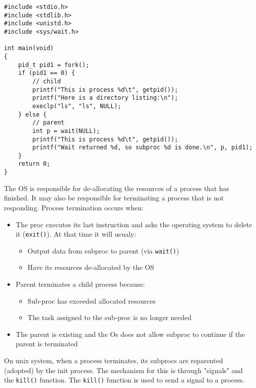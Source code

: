 \documentclass[a4paper, 10pt]{article}
\begin{document}
\begin{lstlisting}[style=cStyle, caption={Overlaying a process using execlp}]
#include <stdio.h>
#include <stdlib.h>
#include <unistd.h>
#include <sys/wait.h>

int main(void)
{
    pid_t pid1 = fork();
    if (pid1 == 0) {
        // child
        printf("This is process %d\t", getpid());
        printf("Here is a directory listing:\n");
        execlp("ls", "ls", NULL);
    } else {
        // parent
        int p = wait(NULL);
        printf("This is process %d\t", getpid());
        printf("Wait returned %d, so subproc %d is done.\n", p, pid1);
    }
    return 0;
}
\end{lstlisting}
The OS is responsible for de-allocating the resources of a process that has finished. It may also be responsible for terminating a process that is not responding. Process termination occurs when:
\begin{itemize}
    \item The proc executes its last instruction and asks the operating system to delete it (\texttt{exit()}). At that time it will usualy:
          \begin{itemize}
              \item Output data from subproc to parent (via \texttt{wait()})
              \item Have its resources de-allocated by the OS
          \end{itemize}
    \item Parent terminates a child process because:
          \begin{itemize}
              \item Sub-proc has exceeded allocated resources
              \item The task assigned to the sub-proc is no longer needed
          \end{itemize}
    \item The parent is existing and the Os does not allow subproc to continue if the parent is terminated
\end{itemize}
On unix system, when a process terminates, its subprocs are reparented (adopted) by the init process. The mechanism for this is through "signals" and the \texttt{kill()} function. The \texttt{kill()} function is used to send a signal to a process.
\end{document}
